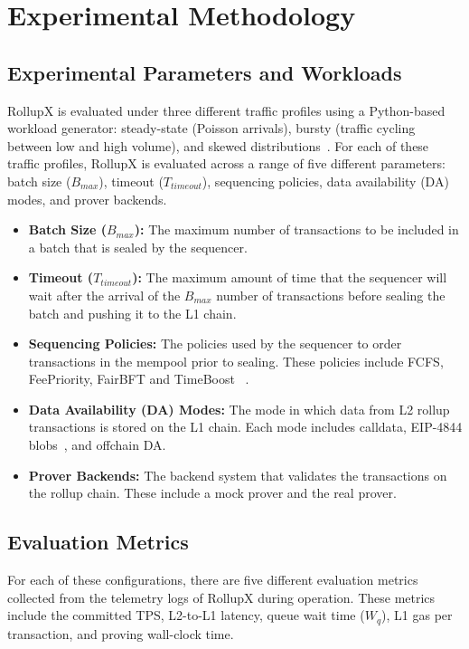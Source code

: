 \section{Experimental Methodology}

\subsection{Experimental Parameters and Workloads}
RollupX is evaluated under three different traffic profiles using a Python-based workload generator: steady-state (Poisson arrivals), bursty (traffic cycling between low and high volume), and skewed distributions~\cite{silva2024zksyncdataset}. For each of these traffic profiles, RollupX is evaluated across a range of five different parameters: batch size ($B_{max}$), timeout ($T_{timeout}$), sequencing policies, data availability (DA) modes, and prover backends.

\begin{itemize}
\item \textbf{Batch Size ($B_{max}$):} The maximum number of transactions to be included in a batch that is sealed by the sequencer.
\item \textbf{Timeout ($T_{timeout}$):} The maximum amount of time that the sequencer will wait after the arrival of the $B_{max}$ number of transactions before sealing the batch and pushing it to the L1 chain.
\item \textbf{Sequencing Policies:} The policies used by the sequencer to order transactions in the mempool prior to sealing. These policies include FCFS, FeePriority, FairBFT and TimeBoost ~\cite{timeboost_docs}.
\item \textbf{Data Availability (DA) Modes:} The mode in which data from L2 rollup transactions is stored on the L1 chain. Each mode includes calldata, EIP-4844 blobs~\cite{eip4844}, and offchain DA.
\item \textbf{Prover Backends:} The backend system that validates the transactions on the rollup chain. These include a mock prover and the real prover.
\end{itemize}

\subsection{Evaluation Metrics}
For each of these configurations, there are five different evaluation metrics collected from the telemetry logs of RollupX during operation. These metrics include the committed TPS, L2-to-L1 latency, queue wait time ($W_q$), L1 gas per transaction, and proving wall-clock time.

